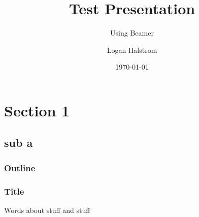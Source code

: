 \documentclass{beamer}
\title{Test Presentation}
\subtitle{Using Beamer}
\author{Logan Halstrom}
\institute{UCD + NASA}
\date{\today}
\begin{document}

\begin{frame}
\titlepage
\end{frame}


\section{Section 1}
\subsection{sub a}

\begin{frame}
\frametitle{Outline}
\tableofcontents
\end{frame}


\begin{frame}
\frametitle{Title}
Words about stuff and stuff
\end{frame}
\end{document}
